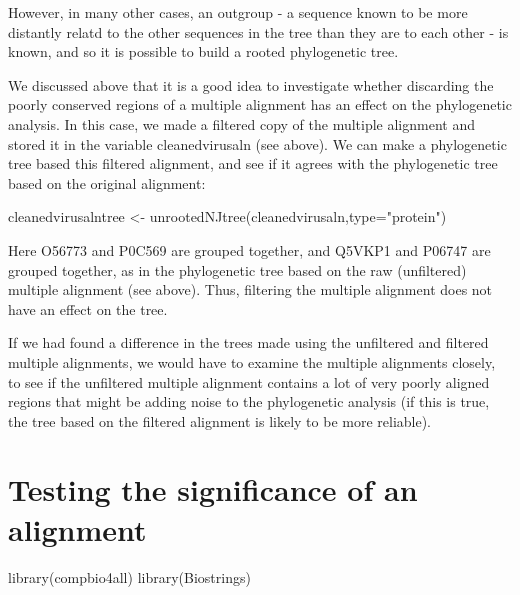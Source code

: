 \documentclass[
]{book}
\newenvironment{Shaded}{\begin{snugshade}}{\end{snugshade}}
\newcommand{\AttributeTok}[1]{\textcolor[rgb]{0.77,0.63,0.00}{#1}}
\newcommand{\FunctionTok}[1]{\textcolor[rgb]{0.00,0.00,0.00}{#1}}
\newcommand{\NormalTok}[1]{#1}
\newcommand{\OtherTok}[1]{\textcolor[rgb]{0.56,0.35,0.01}{#1}}
\newcommand{\StringTok}[1]{\textcolor[rgb]{0.31,0.60,0.02}{#1}}
\begin{document}
However, in many other cases, an outgroup - a sequence known to be more distantly relatd to the other sequences in the tree than they are to each other - is known, and so it is possible to build a rooted phylogenetic tree.

We discussed above that it is a good idea to investigate whether discarding the poorly conserved regions of a multiple alignment has an effect on the phylogenetic analysis. In this case, we made a filtered copy of the multiple alignment and stored it in the variable cleanedvirusaln (see above). We can make a phylogenetic tree based this filtered alignment, and see if it agrees with the phylogenetic tree based on the original alignment:

\begin{Shaded}
\begin{Highlighting}[]
\NormalTok{cleanedvirusalntree }\OtherTok{\textless{}{-}} \FunctionTok{unrootedNJtree}\NormalTok{(cleanedvirusaln,}\AttributeTok{type=}\StringTok{"protein"}\NormalTok{)}
\end{Highlighting}
\end{Shaded}

Here O56773 and P0C569 are grouped together, and Q5VKP1 and P06747 are grouped together, as in the phylogenetic tree based on the raw (unfiltered) multiple alignment (see above). Thus, filtering the multiple alignment does not have an effect on the tree.

If we had found a difference in the trees made using the unfiltered and filtered multiple alignments, we would have to examine the multiple alignments closely, to see if the unfiltered multiple alignment contains a lot of very poorly aligned regions that might be adding noise to the phylogenetic analysis (if this is true, the tree based on the filtered alignment is likely to be more reliable).

\hypertarget{testing-the-significance-of-an-alignment}{%
\chapter{Testing the significance of an alignment}\label{testing-the-significance-of-an-alignment}}

\begin{Shaded}
\begin{Highlighting}[]
\FunctionTok{library}\NormalTok{(compbio4all)}
\FunctionTok{library}\NormalTok{(Biostrings)}
\end{Highlighting}
\end{Shaded}
\end{document}
